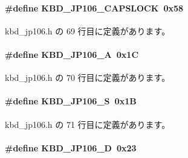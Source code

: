 \paragraph[{K\+B\+D\+\_\+\+J\+P106\+\_\+\+C\+A\+P\+S\+L\+O\+C\+K}]{\setlength{\rightskip}{0pt plus 5cm}\#define K\+B\+D\+\_\+\+J\+P106\+\_\+\+C\+A\+P\+S\+L\+O\+C\+K~0x58}\label{kbd__jp106_8h_a3dbc32c349f57dcc1cb218129e514183_a3dbc32c349f57dcc1cb218129e514183}


 kbd\+\_\+jp106.\+h の 69 行目に定義があります。

\paragraph[{K\+B\+D\+\_\+\+J\+P106\+\_\+\+A}]{\setlength{\rightskip}{0pt plus 5cm}\#define K\+B\+D\+\_\+\+J\+P106\+\_\+\+A~0x1\+C}\label{kbd__jp106_8h_a11ef36ca07322b3ca6d18d54f31e44ac_a11ef36ca07322b3ca6d18d54f31e44ac}


 kbd\+\_\+jp106.\+h の 70 行目に定義があります。

\paragraph[{K\+B\+D\+\_\+\+J\+P106\+\_\+\+S}]{\setlength{\rightskip}{0pt plus 5cm}\#define K\+B\+D\+\_\+\+J\+P106\+\_\+\+S~0x1\+B}\label{kbd__jp106_8h_a9a6d03222dca3fb33a12375c744f9667_a9a6d03222dca3fb33a12375c744f9667}


 kbd\+\_\+jp106.\+h の 71 行目に定義があります。

\paragraph[{K\+B\+D\+\_\+\+J\+P106\+\_\+\+D}]{\setlength{\rightskip}{0pt plus 5cm}\#define K\+B\+D\+\_\+\+J\+P106\+\_\+\+D~0x23}\label{kbd__jp106_8h_a6d5da29b0752bbac8d53059d1a66afe7_a6d5da29b0752bbac8d53059d1a66afe7}


